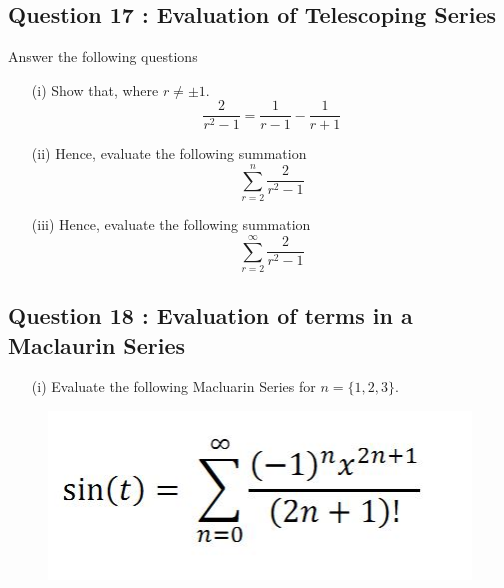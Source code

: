\documentclass[]{article}
\begin{document}
\bigskip

\subsection*{Question 17 : Evaluation of Telescoping Series}
Answer the following questions
\begin{itemize}
	\item[(i)] Show that, where $r \neq \pm 1$.
	\[ \frac{2}{r^2-1} =  \frac{1}{r-1} - \frac{1}{r+1} \]
	
	\item[(ii)] Hence, evaluate the following summation
	\[  \sum^{n}_{r=2} \frac{2}{r^2-1} \]
	\item[(iii)] Hence, evaluate the following summation
	\[  \sum^{\infty}_{r=2} \frac{2}{r^2-1} \]
\end{itemize}


\bigskip

\subsection*{Question 18 : Evaluation of terms in a Maclaurin Series}
\large
\begin{itemize}
	\item[(i)] Evaluate the following Macluarin Series for $n=\{1,2,3\}$.
\end{itemize}
\begin{figure}[h!]
	\centering
	\includegraphics[width=0.30\linewidth]{macl3}
	\label{fig:macl3}
\end{figure}

\newpage
\end{document}
